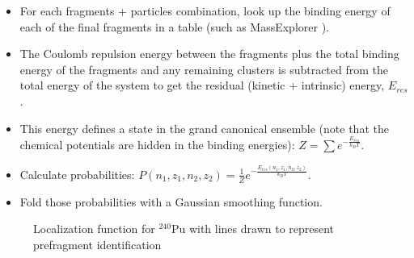 \begin{itemize}
	\item For each fragments + particles combination, look up the binding energy of each of the final fragments in a table (such as  MassExplorer \cite{massexplorer}).
	\item The Coulomb repulsion energy between the fragments plus the total binding energy of the fragments and any remaining clusters is subtracted from the total energy of the system to get the residual (kinetic + intrinsic) energy, $E_{res}$.
	\item This energy defines a state in the grand canonical ensemble (note that the chemical potentials are hidden in the binding energies): $Z = \sum e^{-\frac{E_{res}}{k_BT}}$.
	\item Calculate probabilities: $P(n_1,z_1,n_2,z_2) = \frac{1}{Z} e^{-\frac{E_{res}(n_1,z_1,n_2,z_2)}{k_BT}}$.
	\item Fold those probabilities with a Gaussian smoothing function.
\end{itemize}

\begin{figure}%
	\centering
	\qquad
	\caption{Localization function for $^{240}$Pu with lines drawn to represent prefragment identification}%
	\label{fig:methods240Pulocali}%
\end{figure}


